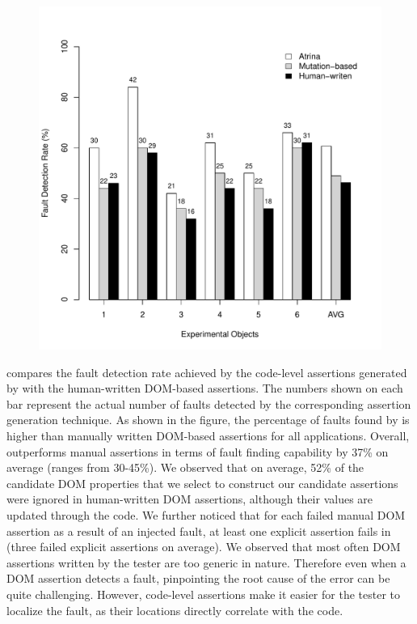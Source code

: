 \begin{figure}[!t]
  \centering
  \includegraphics[width=0.8\hsize]{r-scripts/barplot-faultDetectionRate}
  \vspace{-0.18in}   
  \vspace{-0.3in} 
  \label{Fig:barplot-faultDetectionRate}
\end{figure}
 compares the fault detection rate achieved by the code-level assertions generated by \tool with the human-written DOM-based assertions. The numbers shown on each bar represent the actual number of faults detected by the corresponding assertion generation technique. As shown in the figure, the percentage of faults found by \tool is higher than manually written DOM-based assertions for all applications. Overall, \tool outperforms manual assertions in terms of fault finding capability by 37\% on average (ranges from 30-45\%). We observed that on average, 52\% of the candidate DOM properties that we select to construct our candidate assertions were ignored in human-written DOM assertions, although their values are updated through the \javascript code.
We further noticed that for each failed manual DOM assertion as a result of an injected fault, at least one explicit assertion fails in \tool (three failed explicit assertions on average).
We observed that most often DOM assertions written by the tester are too generic in nature. Therefore even when a DOM assertion detects a \javascript fault, pinpointing the root cause of the error can be quite challenging. However, code-level assertions make it easier for the tester to localize the fault, as their locations directly correlate with the code.

